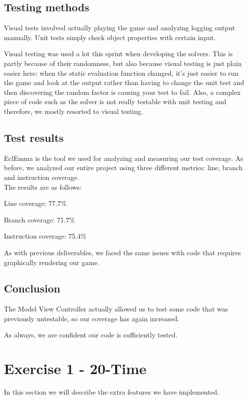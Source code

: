 \documentclass[a4paper,11pt,report]{scrartcl}
\begin{document}
\subsection{Testing methods}
Visual tests involved actually playing the game and analyzing logging output
manually. Unit tests simply check object properties with certain input.

Visual testing was used a lot this sprint when developing the solvers. This is
partly because of their randomness, but also because visual testing is just
plain easier here: when the static evaluation function changed, it's just easier
to run the game and look at the output rather than having to change the unit test and
then discovering the random factor is causing your test to fail. Also, a complex
piece of code such as the solver is not really testable with unit testing and
therefore, we mostly resorted to visual testing.

\subsection{Test results}
EclEmma is the tool we used for analyzing and measuring our test coverage.
As before, we analyzed our entire project using three different metrics: line,
branch and instruction coverage.\\

The results are as follows:
\begin{description}
	\item Line coverage: 77.7\%
	\item Branch coverage: 71.7\%
	\item Instruction coverage: 75.4\%
\end{description}
As with previous deliverables, we faced the same issues with code that requires
graphically rendering our game. 

\subsection{Conclusion}
The Model View Controller actually allowed us to test some code that was
previously untestable, so our coverage has again increased.

As always, we are confident our code is sufficiently tested.

\newpage\section{Exercise 1 - 20-Time}
In this section we will describe the extra features we have implemented.
\end{document}
